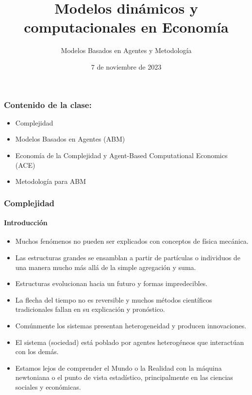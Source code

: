 \documentclass[11pt]{beamer}
\begin{document}
	\title{Modelos dinámicos y computacionales en Economía}
	\subtitle{Modelos Basados en Agentes y Metodología}
	\date{7 de noviembre de 2023}


\begin{frame}
\frametitle{Contenido de la clase:}
\begin{itemize}
	\item Complejidad
 \item Modelos Basados en Agentes (ABM)
 \item Economía de la Complejidad y Agent-Based Computational Economics (ACE)
 \item Metodología para ABM
\end{itemize}
\end{frame}

\begin{frame}
	\frametitle{Complejidad}
 \framesubtitle{Introducción}
\begin{itemize}
\small \item Muchos fenómenos no pueden ser explicados con conceptos de física mecánica.
\item Las estructuras grandes se ensamblan a partir de partículas o individuos de una manera mucho más allá de la simple agregación y suma.
\item Estructuras evolucionan hacia un futuro y formas impredecibles.
\item La flecha del tiempo no es reversible y muchos métodos científicos tradicionales fallan en su explicación y pronóstico.
\item Comúnmente los sistemas presentan heterogeneidad y producen innovaciones.
\item El sistema (sociedad) está poblado por agentes heterogéneos que interactúan con los demás.
\item Estamos lejos de comprender el Mundo o la Realidad con la máquina newtoniana o el punto de vista estadístico, principalmente en las ciencias sociales y económicas.
\end{itemize}

\end{frame}
\end{document}
